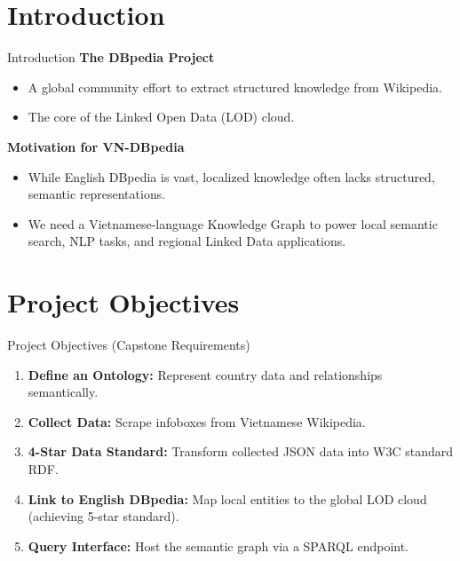 \documentclass[aspectratio=169]{beamer}
\begin{document}
\section{Introduction}
\begin{frame}{Introduction}
    \textbf{The DBpedia Project}
    \begin{itemize}
        \item A global community effort to extract structured knowledge from Wikipedia.
        \item The core of the Linked Open Data (LOD) cloud.
    \end{itemize}
    \vspace{0.5cm}
    \textbf{Motivation for VN-DBpedia}
    \begin{itemize}
        \item While English DBpedia is vast, localized knowledge often lacks structured, semantic representations.
        \item We need a Vietnamese-language Knowledge Graph to power local semantic search, NLP tasks, and regional Linked Data applications.
    \end{itemize}
\end{frame}

\section{Project Objectives}
\begin{frame}{Project Objectives (Capstone Requirements)}
    \begin{enumerate}
        \item \textbf{Define an Ontology:} Represent country data and relationships semantically.
        \item \textbf{Collect Data:} Scrape infoboxes from Vietnamese Wikipedia.
        \item \textbf{4-Star Data Standard:} Transform collected JSON data into W3C standard RDF.
        \item \textbf{Link to English DBpedia:} Map local entities to the global LOD cloud (achieving 5-star standard).
        \item \textbf{Query Interface:} Host the semantic graph via a SPARQL endpoint.
    \end{enumerate}
\end{frame}

\end{document}
